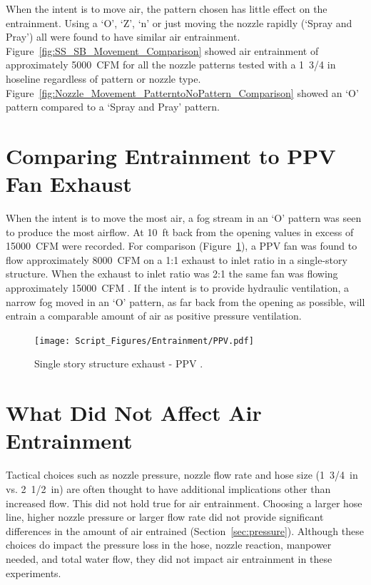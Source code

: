 \documentclass[12pt,oneside]{book}
\begin{document}
When the intent is to move air, the pattern chosen has little effect on the entrainment. Using a `O', `Z', `n' or just moving the nozzle rapidly (`Spray and Pray') all were found to have similar air entrainment. Figure~\ref{fig:SS_SB_Movement_Comparison} showed air entrainment of approximately 5000~CFM for all the nozzle patterns tested with a 1~3/4 in hoseline regardless of pattern or nozzle type. Figure~\ref{fig:Nozzle_Movement_PatterntoNoPattern_Comparison} showed an `O' pattern compared to a `Spray and Pray' pattern.

\section{Comparing Entrainment to PPV Fan Exhaust}
When the intent is to move the most air, a fog stream in an `O' pattern was seen to produce the most airflow. At 10~ft back from the opening values in excess of 15000~CFM were recorded. For comparison (Figure~\ref{fig:PPV}), a PPV fan was found to flow approximately 8000~CFM on a 1:1 exhaust to inlet ratio in a single-story structure. When the exhaust to inlet ratio was 2:1 the same fan was flowing approximately 15000~CFM \cite{Zevotek_Kerber:2016}. If the intent is to provide hydraulic ventilation, a narrow fog moved in an `O' pattern, as far back from the opening as possible, will entrain a comparable amount of air as positive pressure ventilation. 

\begin{figure}[H]
\centering
\texttt{[image: Script\_Figures/Entrainment/PPV.pdf]}
\caption[Single Story Structure Exhaust - PPV]{Single story structure exhaust - PPV \cite{Zevotek_Kerber:2016}.}
\label{fig:PPV}
\end{figure}

\section{What Did Not Affect Air Entrainment}
Tactical choices such as nozzle pressure, nozzle flow rate and hose size (1~3/4~in vs. 2~1/2~in) are often thought to have additional implications other than increased flow. This did not hold true for air entrainment. Choosing a larger hose line, higher nozzle pressure or larger flow rate did not provide significant differences in the amount of air entrained (Section~\ref{sec:pressure}). Although these choices do impact the pressure loss in the hose, nozzle reaction, manpower needed, and total water flow, they did not impact air entrainment in these experiments.
\end{document}
